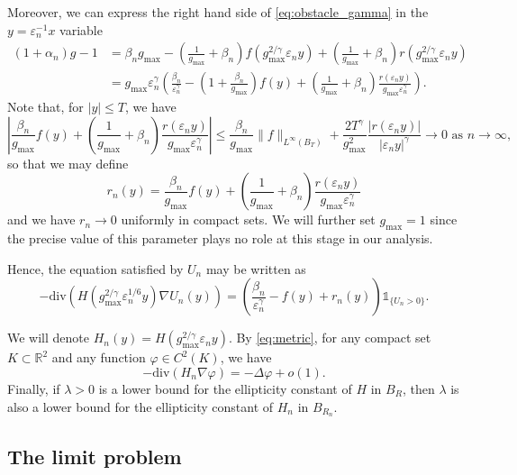 \documentclass[10pt,a4paper]{article}
\newcommand{\gmax}{g_{\mathrm{max}}}
\newcommand{\RR}{\mathbb{R}}
\newcommand{\divg}{\mathrm{div}}
\numberwithin{equation}{section}
\begin{document}
Moreover, we can express the right hand side of \eqref{eq:obstacle_gamma} in the $ y = \varepsilon_n^{-1} x$ variable
\begin{align*}
	 (1+\alpha_n) g - 1  &= \beta_n \gmax - \left(\frac{1}{\gmax} + \beta_n\right) f(\gmax^{2/\gamma} \varepsilon_n y) + \left(\frac{1}{\gmax} + \beta_n\right) r(\gmax^{2/\gamma} \varepsilon_n y) \\
			     &= \gmax \varepsilon_n^{\gamma}\left( \frac{\beta_n}{\varepsilon_n^{\gamma}} - \left(1 + \frac{\beta_n}{\gmax}\right) f(y) + \left(\frac{1}{\gmax} + \beta_n\right) \frac{r(\varepsilon_n y)}{\gmax \varepsilon_n^{\gamma}}  \right). 
 \end{align*}
Note that, for $ |y| \leq T $, we have
\[
	\left| \frac{\beta_n}{\gmax} f(y) + \left(\frac{1}{\gmax} + \beta_n\right) \frac{r(\varepsilon_n y)}{\gmax\varepsilon_n^{\gamma}}\right| \leq \frac{\beta_n}{\gmax} \|f\|_{L^{\infty}(B_T)} + \frac{2T^{\gamma}}{\gmax^2}\frac{|r(\varepsilon_n y)|}{|\varepsilon_n y|^{\gamma}} \rightarrow 0 \text{ as }n\rightarrow \infty, 
\]
so that we may define
\[r_n (y)= \frac{\beta_n}{\gmax} f(y) + \left(\frac{1}{\gmax} + \beta_n\right) \frac{r(\varepsilon_n y)}{\gmax \varepsilon_n^{\gamma}}\]
and we have $r_n \rightarrow 0$ uniformly in compact sets. We will further set $ \gmax = 1 $ since the precise value of this parameter plays no role at this stage in our analysis.

Hence, the equation satisfied by $ U_n $ may be written as
\begin{equation}
	\label{eq:U}
	-\divg(H(\gmax^{2/\gamma}\varepsilon_n^{1/6} y)\nabla U_n(y)) = \left( \frac{\beta_n}{\varepsilon_n^{\gamma}} - f(y) + r_n(y) \right)\mathbb{1}_{\{U_n > 0\}}.
\end{equation}  

We will denote $H_n(y) = H(\gmax^{2/\gamma}\varepsilon_n y)$. By \eqref{eq:metric}, for any compact set $K \subset \RR^{2}$ and any function $ \varphi \in C^{2}(K) $, we have 
\begin{equation}
\label{eq:approx_diff}
	-\divg(H_n \nabla \varphi) = -\Delta \varphi + o(1).
\end{equation}
Finally, if $\lambda > 0$ is a lower bound for the ellipticity constant of $H$ in $B_R$, then $\lambda$ is also a lower bound for the ellipticity constant of $H_n$ in $B_{R_n}$.

\subsection{The limit problem}
\label{sect:limit_prob}
\end{document}
